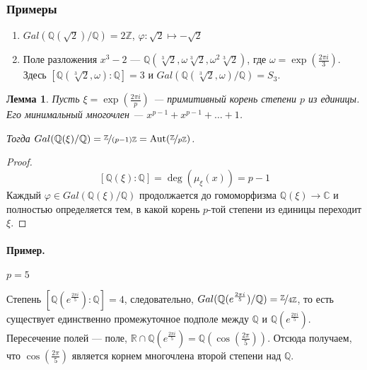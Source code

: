 \documentclass[a4paper]{article}
\newcommand{\R}{\ensuremath{\mathbb{R}}}
\newcommand{\Q}{\ensuremath{\mathbb{Q}}}
\newcommand{\Z}{\ensuremath{\mathbb{Z}}}
\let\temp\phi
\let\phi\varphi
\let\varphi\temp
\DeclareMathOperator{\Aut}{Aut}
\numberwithin{theorem}{section}
\newtheorem{lemma}{Лемма}
\numberwithin{lemma}{section}
\numberwithin{proposition}{section}
\numberwithin{corollary}{section}
\begin{document}
\subsubsection*{Примеры}
\begin{enumerate}
    \item $Gal(\Q(\sqrt{2}) / \Q) = 2\Z$,
          $\phi: \sqrt{2} \mapsto -\sqrt{2}$
    \item Поле разложения $x^3 - 2$ ---
    $\Q(\sqrt[3]{2}, \omega\sqrt[3]{2}, \omega^2\sqrt[3]{2})$,
    где $\omega = \exp(\frac{2\pi i}{3})$.
    Здесь $[\Q(\sqrt[3]{2}, \omega) : \Q] = 3$ и $Gal(\Q(\sqrt[3]{2}, \omega)/\Q) = S_3$.
\end{enumerate}

\begin{lemma}
Пусть $\xi = \exp(\frac{2\pi i}{p})$ --- примитивный корень степени $p$ из единицы.
Его минимальный многочлен --- $x^{p-1}+x^{p-1}+\ldots+1$.

Тогда $Gal(\Q(\xi)/\Q) = \nicefrac{\Z}{(p-1)\Z}
 = \Aut(\nicefrac{\Z}{p\Z})$.
\end{lemma}
\begin{proof}
\[[\Q(\xi):\Q] = \deg(\mu_\xi(x)) = p - 1\]
Каждый $\phi \in Gal(\Q(\xi)/\Q)$ продолжается до
гомоморфизма $\Q(\xi) \to \mathbb{C}$ и полностью определяется тем,
в какой корень $p$-той степени из единицы переходит $\xi$.
\end{proof}

\paragraph*{Пример.} $p = 5$

Степень $[\Q(e^\frac{2\pi i}{5}) : \Q] = 4$, следовательно,
$Gal(\Q(e^\frac{2\pi i}{5})/\Q) = \nicefrac{\Z}{4\Z}$, то есть
существует единственно промежуточное подполе между $\Q$ и $\Q(e^\frac{2\pi i}{5})$.
Пересечение полей --- поле, $\R \cap \Q(e^\frac{2\pi i}{5}) = \Q(\cos(\frac{2\pi}{5}))$.
Отсюда получаем, что $\cos(\frac{2\pi}{5})$ является корнем
многочлена второй степени над $\Q$.
\end{document}
